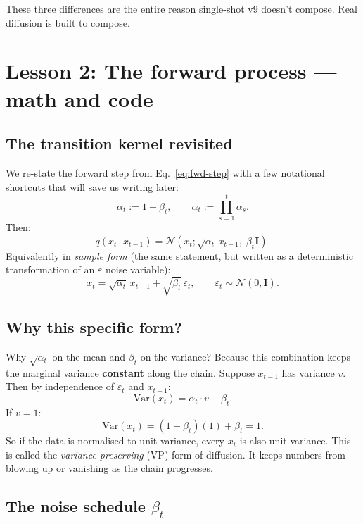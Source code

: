 \documentclass[11pt,a4paper]{article}
\newcommand{\N}{\mathcal{N}}
\newcommand{\given}{\,|\,}
\newcommand{\eps}{\varepsilon}
\begin{document}
These three differences are the entire reason single-shot v9 doesn't
compose. Real diffusion is built to compose.

\section{Lesson 2: The forward process --- math and code}

\subsection{The transition kernel revisited}

We re-state the forward step from Eq.~\eqref{eq:fwd-step} with a few
notational shortcuts that will save us writing later:
\begin{equation}
\alpha_t := 1 - \beta_t,
\qquad
\bar{\alpha}_t := \prod_{s=1}^{t} \alpha_s.
\end{equation}
Then:
\begin{equation}
q(x_t \given x_{t-1}) = \N(x_t; \sqrt{\alpha_t}\, x_{t-1},\; \beta_t \mathbf{I}).
\end{equation}
Equivalently in \emph{sample form} (the same statement, but written
as a deterministic transformation of an $\eps$ noise variable):
\begin{equation}
\boxed{\;
x_t = \sqrt{\alpha_t}\, x_{t-1} + \sqrt{\beta_t}\, \eps_t,
\qquad
\eps_t \sim \N(0,\mathbf{I}).\;}
\label{eq:fwd-sample}
\end{equation}

\subsection{Why this specific form?}

Why $\sqrt{\alpha_t}$ on the mean and $\beta_t$ on the variance? Because
this combination keeps the marginal variance \textbf{constant} along the
chain. Suppose $x_{t-1}$ has variance $v$. Then by independence of $\eps_t$
and $x_{t-1}$:
\[
\mathrm{Var}(x_t) = \alpha_t \cdot v + \beta_t.
\]
If $v=1$:
\[
\mathrm{Var}(x_t) = (1-\beta_t)(1) + \beta_t = 1.
\]
So if the data is normalised to unit variance, every $x_t$ is also
unit variance. This is called the \emph{variance-preserving} (VP) form
of diffusion. It keeps numbers from blowing up or vanishing as the
chain progresses.

\subsection{The noise schedule \texorpdfstring{$\beta_t$}{beta\_t}}
\end{document}
